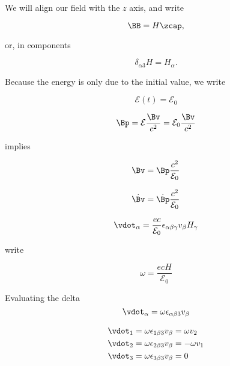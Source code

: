 {We will align our field with the $z$ axis, and write

\begin{equation}\label{eqn:relativisticElectrodynamicsT3:560}
\BB = H \zcap,
\end{equation}

or, in components

\begin{equation}\label{eqn:relativisticElectrodynamicsT3:580}
\delta_{\alpha 3} H = H_\alpha.
\end{equation}

Because the energy is only due to the initial value, we write

\begin{equation}\label{eqn:relativisticElectrodynamicsT3:540}
\mathcal{E}(t) = \mathcal{E}_0
\end{equation}

\begin{equation}\label{eqn:relativisticElectrodynamicsT3:600}
\Bp = \mathcal{E} \frac{\Bv}{c^2} = \mathcal{E}_0 \frac{\Bv}{c^2}
\end{equation}

implies

\begin{equation}\label{eqn:relativisticElectrodynamicsT3:620}
\Bv = \Bp \frac{c^2}{\mathcal{E}_0}
\end{equation}

\begin{equation}\label{eqn:relativisticElectrodynamicsT3:640}
\dot{\Bv} = \dot{\Bp} \frac{c^2}{\mathcal{E}_0}
\end{equation}

\begin{equation}\label{eqn:relativisticElectrodynamicsT3:660}
\vdot_\alpha = \frac{e c}{\mathcal{E}_0} \epsilon_{\alpha \beta \gamma} v_\beta H_\gamma
\end{equation}

write

\begin{equation}\label{eqn:relativisticElectrodynamicsT3:680}
\omega = \frac{e c H}{\mathcal{E}_0}
\end{equation}

Evaluating the delta 
\begin{equation}\label{eqn:relativisticElectrodynamicsT3:700}
\vdot_\alpha = \omega \epsilon_{\alpha \beta 3} v_\beta
\end{equation}

\begin{equation}\label{eqn:relativisticElectrodynamicsT3:720}
\begin{aligned}
\vdot_1 &= \omega \epsilon_{1 \beta 3} v_\beta = \omega v_2 \\
\vdot_2 &= \omega \epsilon_{2 \beta 3} v_\beta = - \omega v_1 \\
\vdot_3 &= \omega \epsilon_{3 \beta 3} v_\beta = 0
\end{aligned}
\end{equation}

}
